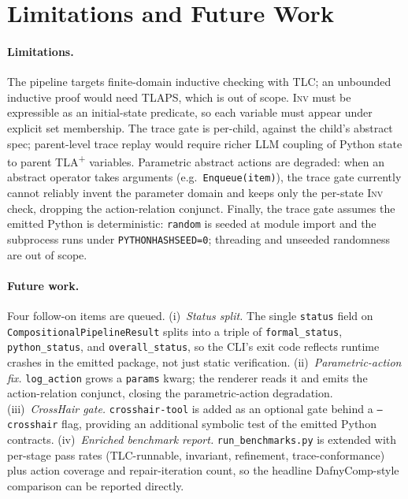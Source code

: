 \documentclass[11pt]{article}
\newcommand{\TLA}{TLA\textsuperscript{+}}
\newcommand{\inv}{\textsc{Inv}}
\begin{document}
\section{Limitations and Future Work}\label{sec:limits}

\paragraph{Limitations.} The pipeline targets finite-domain inductive
checking with TLC; an unbounded inductive proof would need
TLAPS, which is out of scope. \inv{} must be expressible as an
initial-state predicate, so each variable must appear under explicit set
membership. The trace gate is per-child, against the child's abstract
spec; parent-level trace replay would require richer LLM coupling of
Python state to parent \TLA{} variables. Parametric abstract actions are
degraded: when an abstract operator takes arguments (e.g.\ \texttt{Enqueue(item)}),
the trace gate currently cannot reliably invent the parameter domain and
keeps only the per-state \inv{} check, dropping the action-relation
conjunct. Finally, the trace gate assumes the emitted Python is
deterministic: \texttt{random} is seeded at module import and the
subprocess runs under \texttt{PYTHONHASHSEED=0}; threading and unseeded
randomness are out of scope.

\paragraph{Future work.} Four follow-on items are queued.
(i)~\emph{Status split.} The single \texttt{status} field on
\texttt{CompositionalPipelineResult} splits into a triple of
\texttt{formal\_status}, \texttt{python\_status}, and
\texttt{overall\_status}, so the CLI's exit code reflects runtime
crashes in the emitted package, not just static verification. (ii)~\emph{Parametric-action fix.}
\texttt{log\_action} grows a \texttt{params} kwarg; the renderer reads it
and emits the action-relation conjunct, closing the parametric-action
degradation. (iii)~\emph{CrossHair gate.} \texttt{crosshair-tool} is added
as an optional gate behind a \texttt{--crosshair} flag, providing an
additional symbolic test of the emitted Python contracts.
(iv)~\emph{Enriched benchmark report.} \texttt{run\_benchmarks.py} is
extended with per-stage pass rates (TLC-runnable, invariant,
refinement, trace-conformance) plus action coverage and repair-iteration
count, so the headline DafnyComp-style comparison can be reported
directly.
\end{document}
